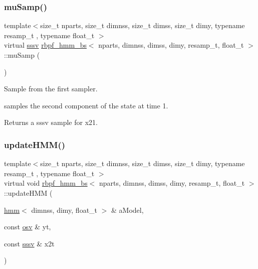 \subsubsection{\texorpdfstring{mu\+Samp()}{muSamp()}}
{\footnotesize\ttfamily template$<$size\+\_\+t nparts, size\+\_\+t dimnss, size\+\_\+t dimss, size\+\_\+t dimy, typename resamp\+\_\+t , typename float\+\_\+t $>$ \\
virtual \hyperlink{classrbpf__hmm__bs_a9a1c8d64f693a34a902dbfcb009d0f96}{sssv} \hyperlink{classrbpf__hmm__bs}{rbpf\+\_\+hmm\+\_\+bs}$<$ nparts, dimnss, dimss, dimy, resamp\+\_\+t, float\+\_\+t $>$\+::mu\+Samp (\begin{DoxyParamCaption}{ }\end{DoxyParamCaption})\hspace{0.3cm}{\ttfamily [pure virtual]}}



Sample from the first sampler. 

samples the second component of the state at time 1. \begin{DoxyReturn}{Returns}
a sssv sample for x21. 
\end{DoxyReturn}
\mbox{\label{classrbpf__hmm__bs_ac0332253c74384c27eaf81c75cf751aa}} 
\subsubsection{\texorpdfstring{update\+H\+M\+M()}{updateHMM()}}
{\footnotesize\ttfamily template$<$size\+\_\+t nparts, size\+\_\+t dimnss, size\+\_\+t dimss, size\+\_\+t dimy, typename resamp\+\_\+t , typename float\+\_\+t $>$ \\
virtual void \hyperlink{classrbpf__hmm__bs}{rbpf\+\_\+hmm\+\_\+bs}$<$ nparts, dimnss, dimss, dimy, resamp\+\_\+t, float\+\_\+t $>$\+::update\+H\+MM (\begin{DoxyParamCaption}\item[{\hyperlink{classhmm}{hmm}$<$ dimnss, dimy, float\+\_\+t $>$ \&}]{a\+Model,  }\item[{const \hyperlink{classrbpf__hmm__bs_a6ec23f9c6eff96f8967c3c451c32b772}{osv} \&}]{yt,  }\item[{const \hyperlink{classrbpf__hmm__bs_a9a1c8d64f693a34a902dbfcb009d0f96}{sssv} \&}]{x2t }\end{DoxyParamCaption})\hspace{0.3cm}{\ttfamily [pure virtual]}}



